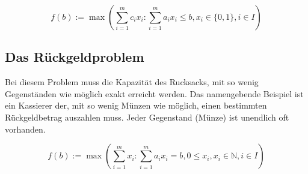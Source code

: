 \documentclass[12pt, a4paper, ngerman]{article}
\newcommand{\natnums}{\ensuremath{\mathbb{N}}}
\begin{document}
\[
  f(b):=\max(\sum_{i=1}^mc_ix_i : \sum_{i=1}^ma_ix_i\leq b, x_i\in\{0,1\}, i\in I)
\]



\subsection{Das Rückgeldproblem}

Bei diesem Problem muss die Kapazität des Rucksacks,
mit so wenig Gegenständen wie möglich exakt erreicht werden.
Das namengebende Beispiel ist ein Kassierer der,
mit so wenig Münzen wie möglich,
einen bestimmten Rückgeldbetrag auszahlen muss.
Jeder Gegenstand (Münze) ist unendlich oft vorhanden.

\[
  f(b):=\max(\sum_{i=1}^mx_i : \sum_{i=1}^ma_ix_i=b, 0\leq x_i, x_i\in\natnums, i\in I)
\]


\newpage
\printbibliography
\end{document}
